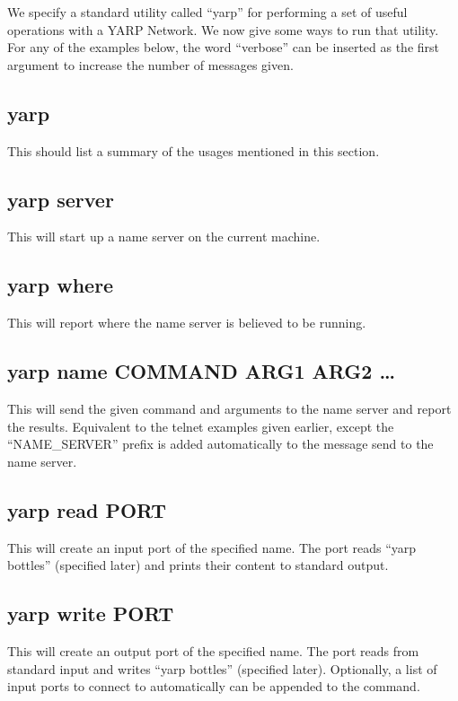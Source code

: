 \documentclass[a4]{article}
\begin{document}
We specify a standard utility called ``yarp'' for performing a set of
useful operations with a YARP Network.  We now give some ways to run that 
utility.  For any of the examples below, the word ``verbose'' can 
be inserted as the first argument to increase the number of 
messages given.

\subsection{yarp}

This should list a summary of the usages mentioned in this section.

\subsection{yarp server}

This will start up a name server on the current machine.

\subsection{yarp where}

This will report where the name server is believed to be running.

\subsection{yarp name COMMAND ARG1 ARG2 \ldots}

This will send the given command and arguments to the name
server and report the results.  Equivalent to the telnet
examples given earlier, except the ``NAME\_SERVER'' prefix
is added automatically to the message send to the name server.

\subsection{yarp read PORT}

This will create an input port of the specified name.  The port
reads ``yarp bottles'' (specified later) and prints their content
to standard output.

\subsection{yarp write PORT}

This will create an output port of the specified name.  The port
reads from standard input and writes ``yarp bottles'' (specified later).
Optionally, a list of input ports to connect to automatically can be
appended to the command.
\end{document}
